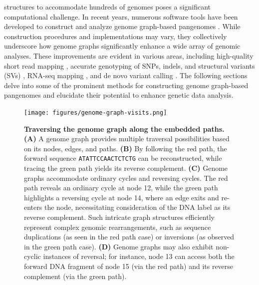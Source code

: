 \documentclass[a4paper, titlepage, openright]{book}
\begin{document}
structures to accommodate hundreds of genomes poses a  significant computational challenge. In recent years, numerous software tools have been developed to construct and analyze genome graph-based pangenomes \citep{andreace2023comparing}. While construction procedures and implementations may vary, they collectively underscore how genome graphs significantly enhance a wide array of genomic analyses. These improvements are evident in various areas, including high-quality short read mapping \citep{siren2021pangenomics}, accurate genotyping of SNPs, indels, and structural variants (SVs) \citep{ebler2022pangenome}, RNA-seq mapping \citep{liao2023draft}, and de novo variant calling \citep{garrison2018variation}. The following sections delve into some of the prominent methods for constructing genome graph-based pangenomes and elucidate their potential to enhance genetic data analysis.

\begin{figure}[!]
	\centering
	\texttt{[image: figures/genome-graph-visits.png]}
	\caption[Traversing the genome graph along the embedded paths]{\textbf{Traversing the genome graph along the embedded paths. (A)} A genome graph provides multiple traversal possibilities based on its nodes, edges, and paths. \textbf{(B)} By following the red path, the forward sequence \texttt{ATATTCCAACTCTCTG} can be reconstructed, while tracing the green path yields its reverse complement. \textbf{(C)} Genome graphs accommodate ordinary cycles and reversing cycles. The red path reveals an ordinary cycle at node 12, while the green path highlights a reversing cycle at node 14, where an edge exits and re-enters the node, necessitating consideration of the DNA label as its reverse complement. Such intricate graph structures efficiently represent complex genomic rearrangements, such as sequence duplications (as seen in the red path case) or inversions (as observed in the green path case). \textbf{(D)} Genome graphs may also exhibit non-cyclic instances of reversal; for instance, node 13 can access both the forward DNA fragment of node 15 (via the red path) and its reverse complement (via the green path).}
	\label{fig:genome-graph-visits}
\end{figure}

\end{document}
